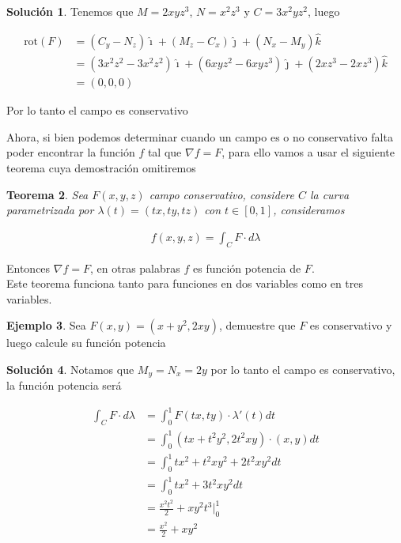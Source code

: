 \documentclass{article}
\theoremstyle{plain}
\newtheorem{thm}{Teorema}[section]
\theoremstyle{definition}
\newtheorem{ejem}[thm]{Ejemplo}
\newtheorem{sol}[thm]{Solución}
\begin{document}
\begin{sol}Tenemos que $M= 2xyz^3$, $ N = x^2z^3$ y $C=3x^2yz^2 $, luego
\end{sol}

\begin{align*}
     \text{rot} ( F )  &= (C_y-N_z)\hat{\imath}+ (M_z-C_x)\hat{\jmath}+ (N_x-M_y)\hat{k} \\
     &= (3x^2z^2-3x^2z^2)\hat{\imath}+(6xyz^2-6xyz^3)\hat{\jmath}+(2xz^3-2xz^3)\hat{k} \\
     &= (0,0,0)
\end{align*}

Por lo tanto el campo es conservativo


\newpage

Ahora, si bien podemos determinar cuando un campo es o no conservativo falta poder encontrar la funci\'on $f$ tal que $\nabla f = F$, para ello vamos a usar el siguiente teorema cuya demostraci\'on omitiremos \\

\begin{thm}Sea $F(x,y,z)$ campo conservativo, considere $C$ la curva parametrizada por $\lambda(t)=(tx,ty,tz)$ con $t \in [0,1]$, consideramos
\end{thm}

\begin{align*}
    f(x,y,z) = \int_C F \cdot d\lambda
\end{align*}

Entonces $\nabla f = F$, en otras palabras $f$ es funci\'on potencia de $F$. \\

Este teorema funciona tanto para funciones en dos variables como en tres variables. \\

\begin{ejem}Sea $F(x,y) =(x+y^2,2xy)$, demuestre que $F$ es conservativo y luego calcule su funci\'on potencia \\
\end{ejem}

\begin{sol}Notamos que $M_y=N_x= 2y$ por lo tanto el campo es conservativo, la funci\'on potencia ser\'a
\end{sol}

\begin{align*}
    \int_C F \cdot d\lambda &= \int_0^1 F(tx,ty) \cdot \lambda'(t)dt \\
    &= \int_0^1 (tx+t^2y^2,2t^2xy) \cdot (x,y)dt \\
    &= \int_0^1 tx^2+t^2xy^2 + 2t^2xy^2dt \\
    &= \int_0^1 tx^2+3t^2xy^2dt \\
    &= \frac{x^2t^2}{2}+xy^2t^3 \bigg|_0^1\\
    &= \frac{x^2}{2}+xy^2
\end{align*}
\end{document}
